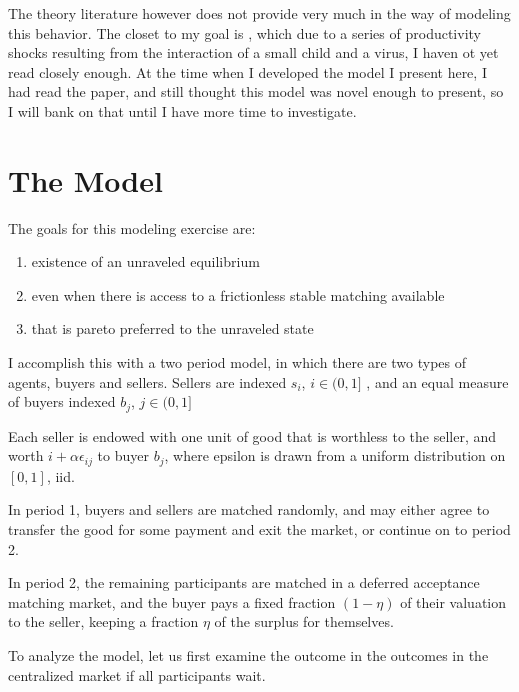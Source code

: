 \documentclass[WP]{AEA}
\begin{document}
The theory literature however does not provide very much in the way of modeling this behavior.  The closet to my goal is \cite{Halaburda2010}, which due to a series of productivity shocks resulting from the interaction of a small child and a virus, I haven ot yet read closely enough.  At the time when I developed the model I present here, I had read the paper, and still thought this model was novel enough to present, so I will bank on that until I have more time to investigate.


\section{The Model}
The goals for this modeling exercise are:
\begin{enumerate}
	\item  existence of an unraveled equilibrium
	\item  even when there is access to a frictionless stable matching available
	\item  that is pareto preferred to the unraveled state
\end{enumerate}


I accomplish this with a two period model, in which there are two types of agents, buyers and sellers.
Sellers are indexed $s_i$, $i \in (0,1]$ , and an equal measure of buyers indexed $b_j$, $j \in (0,1]$

Each seller is endowed with one unit of good that is worthless to the seller, and worth $i+\alpha  \epsilon_{ij}$ to buyer $b_j$, where epsilon is drawn from a uniform distribution on $[0,1]$, iid.

In period 1, buyers and sellers are matched randomly, and may either agree to transfer the good for some payment and exit the market, or continue on to period 2.

In period 2, the remaining participants are matched in a deferred acceptance matching market, and the buyer pays a fixed fraction $(1-\eta)$ of their valuation to the seller, keeping a fraction $\eta$ of the surplus for themselves.

To analyze the model, let us first examine the outcome in the outcomes in the centralized market if all participants wait. 
\end{document}
